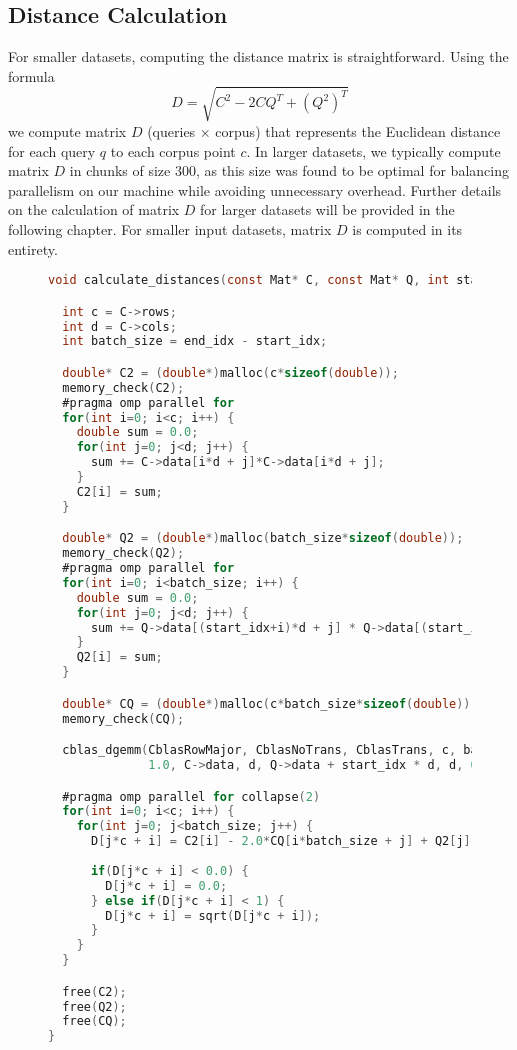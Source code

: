 \documentclass{article}
\begin{document}
\subsection{Distance Calculation}
For smaller datasets, computing the distance matrix is straightforward. Using the formula 
\begin{equation}
    D = \sqrt{C^2 - 2 C Q^T + (Q^2)^T}
\end{equation}
we compute matrix \( D \) (queries $\times$ corpus) that represents the Euclidean distance for each query \( q \) to each corpus point \( c \). In larger datasets, we typically compute matrix \( D \) in chunks of size 300, as this size was found to be optimal for balancing parallelism on our machine while avoiding unnecessary overhead. Further details on the calculation of matrix \( D \) for larger datasets will be provided in the following chapter. For smaller input datasets, matrix \( D \) is computed in its entirety.


\begin{figure}[H]
\begin{lstlisting}[language=C, caption={Calculating distances using CBLAS}]
void calculate_distances(const Mat* C, const Mat* Q, int start_idx, int end_idx, long double* D) {

  int c = C->rows;
  int d = C->cols;
  int batch_size = end_idx - start_idx;

  double* C2 = (double*)malloc(c*sizeof(double));
  memory_check(C2);
  #pragma omp parallel for
  for(int i=0; i<c; i++) {
    double sum = 0.0;
    for(int j=0; j<d; j++) {
      sum += C->data[i*d + j]*C->data[i*d + j];
    }
    C2[i] = sum;
  }

  double* Q2 = (double*)malloc(batch_size*sizeof(double));
  memory_check(Q2);
  #pragma omp parallel for
  for(int i=0; i<batch_size; i++) {
    double sum = 0.0;
    for(int j=0; j<d; j++) {
      sum += Q->data[(start_idx+i)*d + j] * Q->data[(start_idx+i)*d + j];
    }
    Q2[i] = sum;
  }

  double* CQ = (double*)malloc(c*batch_size*sizeof(double));
  memory_check(CQ);

  cblas_dgemm(CblasRowMajor, CblasNoTrans, CblasTrans, c, batch_size, d,
              1.0, C->data, d, Q->data + start_idx * d, d, 0.0, CQ, batch_size);

  #pragma omp parallel for collapse(2)
  for(int i=0; i<c; i++) {
    for(int j=0; j<batch_size; j++) {
      D[j*c + i] = C2[i] - 2.0*CQ[i*batch_size + j] + Q2[j];
      
      if(D[j*c + i] < 0.0) {
        D[j*c + i] = 0.0;
      } else if(D[j*c + i] < 1) {
        D[j*c + i] = sqrt(D[j*c + i]);
      }
    }
  }

  free(C2);
  free(Q2);
  free(CQ);
}
\end{lstlisting}
\end{figure}
\end{document}
